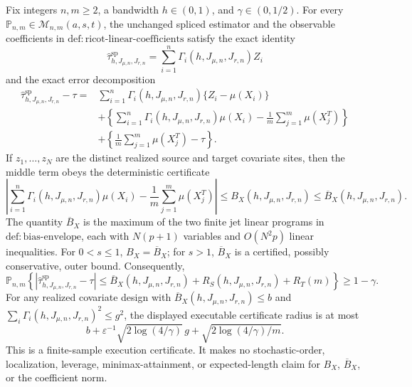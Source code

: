 Fix integers \(n,m\ge2\), a bandwidth \(h\in(0,1)\), and \(\gamma\in(0,1/2)\). For every \(\mathbb P_{n,m}\in\mathcal M_{n,m}(a,s,t)\), the unchanged spliced estimator and the observable coefficients in \(\mathrm{def:ricot\text{-}linear\text{-}coefficients}\) satisfy the exact identity
\[
\widehat\tau^{\mathrm{sp}}_{h,J_{\mu,n},J_{r,n}}=\sum_{i=1}^n\Gamma_i(h,J_{\mu,n},J_{r,n})Z_i
\]
and the exact error decomposition
\[
\begin{aligned}
\widehat\tau^{\mathrm{sp}}_{h,J_{\mu,n},J_{r,n}}-\tau
={}&\sum_{i=1}^n\Gamma_i(h,J_{\mu,n},J_{r,n})\{Z_i-\mu(X_i)\}\\
&+\left\{\sum_{i=1}^n\Gamma_i(h,J_{\mu,n},J_{r,n})\mu(X_i)-\frac1m\sum_{j=1}^m\mu(X_j^T)\right\}\\
&+\left\{\frac1m\sum_{j=1}^m\mu(X_j^T)-\tau\right\}.
\end{aligned}
\]
If \(z_1,\ldots,z_N\) are the distinct realized source and target covariate sites, then the middle term obeys the deterministic certificate
\[
\left|\sum_{i=1}^n\Gamma_i(h,J_{\mu,n},J_{r,n})\mu(X_i)-\frac1m\sum_{j=1}^m\mu(X_j^T)\right|
\le B_X(h,J_{\mu,n},J_{r,n})
\le \overline B_X(h,J_{\mu,n},J_{r,n}).
\]
The quantity \(\overline B_X\) is the maximum of the two finite jet linear programs in \(\mathrm{def:bias\text{-}envelope}\), each with \(N(p+1)\) variables and \(O(N^2p)\) linear inequalities. For \(0<s\le1\), \(B_X=\overline B_X\); for \(s>1\), \(\overline B_X\) is a certified, possibly conservative, outer bound. Consequently,
\[
\mathbb P_{n,m}\!\left\{\left|\widehat\tau^{\mathrm{sp}}_{h,J_{\mu,n},J_{r,n}}-\tau\right|
\le \overline B_X(h,J_{\mu,n},J_{r,n})+R_S(h,J_{\mu,n},J_{r,n})+R_T(m)\right\}\ge1-\gamma.
\]
For any realized covariate design with \(\overline B_X(h,J_{\mu,n},J_{r,n})\le b\) and \(\sum_i\Gamma_i(h,J_{\mu,n},J_{r,n})^2\le g^2\), the displayed executable certificate radius is at most
\[
b+\varepsilon^{-1}\sqrt{2\log(4/\gamma)}\,g+\sqrt{2\log(4/\gamma)/m}.
\]
This is a finite-sample execution certificate. It makes no stochastic-order, localization, leverage, minimax-attainment, or expected-length claim for \(B_X\), \(\overline B_X\), or the coefficient norm.